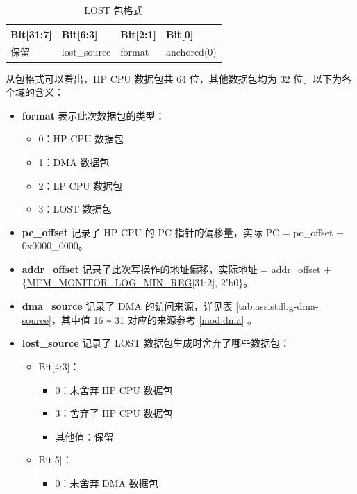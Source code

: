 \documentclass[main\_\_CN.tex]{subfiles}
\begin{document}
    \begin{longtable}[c]{|L{3cm}|L{3cm}|L{3cm}|l|}
    \caption{LOST 包格式}\label{tab:dbgassist-lost-package}
    \\\hline
    \textbf{Bit[31:7]} & \textbf{Bit[6:3]} & \textbf{Bit[2:1]} & \textbf{Bit[0]} \\\hline
    保留 & lost\_source & format & anchored(0) \\\hline
    \end{longtable}

从包格式可以看出，HP CPU 数据包共 64 位，其他数据包均为 32 位。以下为各个域的含义：

\begin{itemize}
    \item \textbf{format} 表示此次数据包的类型：
        \begin{itemize}
            \item 0：HP CPU 数据包
            \item 1：DMA 数据包
            \item 2：LP CPU 数据包
            \item 3：LOST 数据包
        \end{itemize}
    \item \textbf{pc\_offset} 记录了 HP CPU 的 PC 指针的偏移量，实际 PC = pc\_offset + 0x0000\_0000。
    \item \textbf{addr\_offset} 记录了此次写操作的地址偏移，实际地址 = addr\_offset + \{\hyperref[regdesc:MEMMONITORLOGMINREG]{MEM\_MONITOR\_LOG\_MIN\_REG}[31:2], 2'b0\}。
    \item \textbf{dma\_source} 记录了 DMA 的访问来源，详见表 \ref{tab:assistdbg-dma-source}，其中值 16 \verb+~+ 31 对应的来源参考 \ref{mod:dma} \textit{}。
    \item \textbf{lost\_source} 记录了 LOST 数据包生成时舍弃了哪些数据包：
    \begin{itemize}
        \item Bit[4:3]：
        \begin{itemize}
            \item 0：未舍弃 HP CPU 数据包
            \item 3：舍弃了 HP CPU 数据包
            \item 其他值：保留
        \end{itemize}
        \item Bit[5]：
        \begin{itemize}
            \item 0：未舍弃 DMA 数据包

\end{itemize}
\end{itemize}
\end{itemize}
\end{document}
